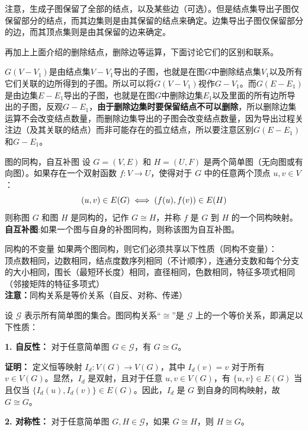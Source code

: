 注意，生成子图保留了全部的结点，以及某些边（可选）。但是结点集导出子图仅保留部分的结点，而其边集则是由其保留的结点来确定。边集导出子图仅保留部分的边，而其顶点集则是由其保留的边来确定。

再加上上面介绍的删除结点，删除边等运算，下面讨论它们的区别和联系。

$G(V-V_1)$是由结点集$V-V_1$导出的子图，也就是在图$G$中删除结点集$V_1$以及所有它们关联的边所得到的子图。所以可以将$G(V-V_1)$视作$G-V_1$。而$G(E-E_1)$是由边集$E-E_1$导出的子图，也就是在图$G$中删除边集$E_1$以及里面的所有边所导出的子图，反观$G-E_1$，\textbf{由于删除边集时要保留结点不可以删除}，所以删除边集运算不会改变结点数量，而删除边集导出的子图会改变结点数量，因为导出过程关注边（及其关联的结点）而非可能存在的孤立结点，所以要注意区别$G(E-E_1)$和$G-E_1$。
\begin{definition}{图的同构，自互补图}{}
设 $G = (V, E)$ 和 $H = (U, F)$ 是两个简单图（无向图或有向图）。如果存在一个双射函数 $f: V \to U$，使得对于 $G$ 中的任意两个顶点 $u, v \in V$：\vspace{-10pt}
\[
(u,v) \in E(G) \iff (f(u), f(v)) \in E(H)\vspace{-10pt}
\]
则称图 $G$ 和图 $H$ 是同构的，记作 $G \cong H$，并称 $f$ 是 $G$ 到 $H$ 的一个同构映射。\\
\textbf{自互补图}:如果一个图与自身的补图同构，则称该图为自互补图。
\end{definition}
\begin{theorem}{同构的不变量}{}
如果两个图同构，则它们必须共享以下性质（同构不变量）：\\
顶点数相同，边数相同，结点度数序列相同（不计顺序），连通分支数和每个分支的大小相同，围长（最短环长度）相同，直径相同，色数相同，特征多项式相同（邻接矩阵的特征多项式）\\
\textbf{注意：}同构关系是等价关系（自反、对称、传递）
\end{theorem}
设 $\mathcal{G}$ 表示所有简单图的集合。图同构关系“$\cong$”是 $\mathcal{G}$ 上的一个等价关系，即满足以下性质：

\textbf{1. 自反性：} 对于任意简单图 $G \in \mathcal{G}$，有 $G \cong G$。

\textbf{证明：}
定义恒等映射 $I_d: V(G) \to V(G)$，其中 $I_d(v) = v$ 对于所有 $v \in V(G)$。显然，$I_d$ 是双射，且对于任意 $u, v \in V(G)$，有 $\{u, v\} \in E(G)$ 当且仅当 $\{I_d(u), I_d(v)\} \in E(G)$。因此，$I_d$ 是 $G$ 到自身的同构映射，故 $G \cong G$。

\textbf{2. 对称性：} 对于任意简单图 $G, H \in \mathcal{G}$，如果 $G \cong H$，则 $H \cong G$。


